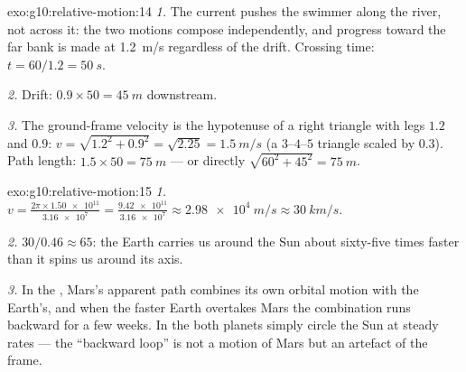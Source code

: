\begin{solution}{exo:g10:relative-motion:14}
\emph{1.} The current pushes the swimmer along the river, not across
it: the two motions compose independently, and progress toward the far
bank is made at \qty{1.2}{m/s} regardless of the drift. Crossing time:
$t = 60/1.2 = \qty{50}{s}$.

\emph{2.} Drift: $0.9 \times 50 = \qty{45}{m}$ downstream.

\emph{3.} The ground-frame velocity is the hypotenuse of a right
triangle with legs $1.2$ and $0.9$:
$v = \sqrt{1.2^2 + 0.9^2} = \sqrt{2.25} = \qty{1.5}{m/s}$ (a $3$--$4$--$5$
triangle scaled by $0.3$). Path length: $1.5 \times 50 = \qty{75}{m}$
--- or directly $\sqrt{60^2 + 45^2} = \qty{75}{m}$.
\end{solution}

\begin{solution}{exo:g10:relative-motion:15}
\emph{1.} $v = \frac{2\pi \times \num{1.50e11}}{\num{3.16e7}}
= \frac{\num{9.42e11}}{\num{3.16e7}} \approx \qty{2.98e4}{m/s}
\approx \qty{30}{km/s}$.

\emph{2.} $30 / 0.46 \approx 65$: the Earth carries us around the Sun
about sixty-five times faster than it spins us around its axis.

\emph{3.} In the , Mars's apparent path combines its
own orbital motion with the Earth's, and when the faster Earth
overtakes Mars the combination runs backward for a few weeks. In the
 both planets simply circle the Sun at steady rates
--- the ``backward loop'' is not a motion of Mars but an artefact of
the frame.
\end{solution}

